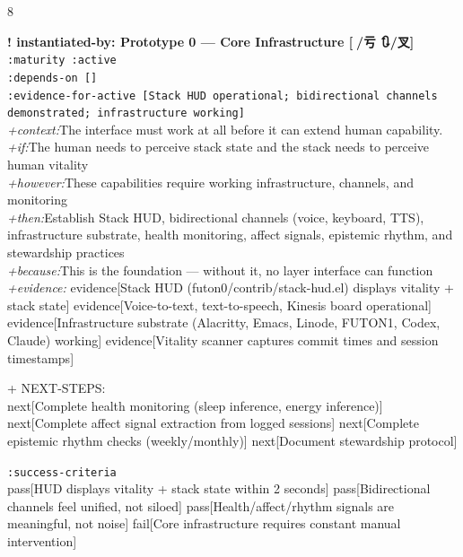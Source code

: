 \documentclass[landscape]{article}
\newcommand{\flexitag}[1]{\textcolor[gray]{0.35}{\textit{#1}}}
\newenvironment{devmapactive}{%
  \def\FrameCommand{\colorbox{devmapactivebg}}%
  \setlength{\fboxsep}{2pt}%
  \MakeFramed{\advance\hsize-\width \FrameRestore}%
}{\endMakeFramed}
\begin{document}
\begin{paracol}{8}
\begin{devmapactive}
\textbf{! instantiated-by: Prototype 0 — Core Infrastructure [🙇/亏 🔃/叉]}\\
  \texttt{:\allowbreak{}maturity :\allowbreak{}active}\\
  \texttt{:\allowbreak{}depends-\allowbreak{}on []}\\
  \texttt{:\allowbreak{}evidence-\allowbreak{}for-\allowbreak{}active [Stack HUD operational;\allowbreak{} bidirectional channels demonstrated;\allowbreak{} infrastructure working]}\\
  \flexitag{+context:}The interface must work at all before it can extend human capability.\\
  \flexitag{+if:}The human needs to perceive stack state and the stack needs to perceive human vitality\\
  \flexitag{+however:}These capabilities require working infrastructure, channels, and monitoring\\
  \flexitag{+then:}Establish Stack HUD, bidirectional channels (voice, keyboard, TTS), infrastructure substrate, health monitoring, affect signals, epistemic rhythm, and stewardship practices\\
  \flexitag{+because:}This is the foundation — without it, no layer interface can function\\
  \flexitag{+evidence:} evidence[Stack HUD (futon0/contrib/stack-hud.el) displays vitality + stack state] evidence[Voice-to-text, text-to-speech, Kinesis board operational] evidence[Infrastructure substrate (Alacritty, Emacs, Linode, FUTON1, Codex, Claude) working] evidence[Vitality scanner captures commit times and session timestamps]\\
\par
  + NEXT-STEPS:\\
    next[Complete health monitoring (sleep inference, energy inference)] next[Complete affect signal extraction from logged sessions] next[Complete epistemic rhythm checks (weekly/monthly)] next[Document stewardship protocol]\\
\par
  \texttt{:\allowbreak{}success-\allowbreak{}criteria}\\
    pass[HUD displays vitality + stack state within 2 seconds] pass[Bidirectional channels feel unified, not siloed] pass[Health/affect/rhythm signals are meaningful, not noise] fail[Core infrastructure requires constant manual intervention]\\
\par
\par
\end{devmapactive}

\end{paracol}
\end{document}
